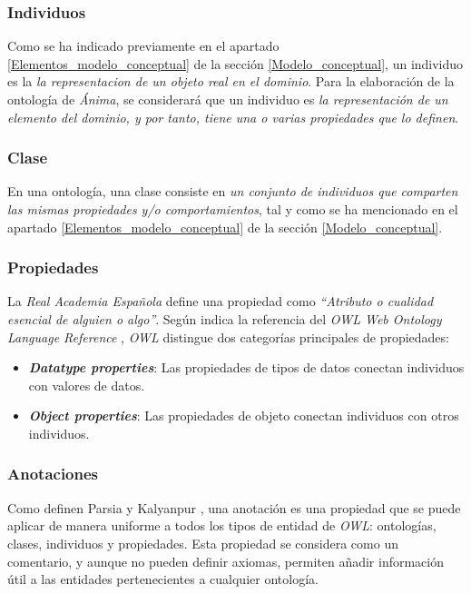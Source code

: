 \subsubsection{Individuos}
Como se ha indicado previamente en el apartado \ref*{Elementos_modelo_conceptual} de la sección \ref*{Modelo_conceptual}, 
un individuo es la \textit{la representacion de un objeto real en el dominio}. Para la elaboración de la ontología de 
\textit{Ánima}, se considerará que un individuo es \textit{la representación de un elemento del dominio, y por tanto, 
tiene una o varias propiedades que lo definen}.

\subsubsection{Clase}
En una ontología, una clase consiste en \textit{un conjunto de individuos que comparten las mismas propiedades y/o 
comportamientos}, tal y como se ha mencionado en el apartado \ref*{Elementos_modelo_conceptual} 
de la sección \ref*{Modelo_conceptual}.

\subsubsection{Propiedades}
La \textit{Real Academia Española} \autocite*{propiedadRAE} define una propiedad como 
\textit{“Atributo o cualidad esencial de alguien o algo”}. Según indica la referencia del 
\textit{OWL Web Ontology Language Reference} \autocite*{Bechhofer2004a}, \textit{OWL} distingue 
dos categorías principales de propiedades:

\begin{itemize}
    \item \textit{\textbf{Datatype properties}}: Las propiedades de tipos de datos conectan individuos con valores de datos.
    \item \textit{\textbf{Object properties}}: Las propiedades de objeto conectan individuos con otros individuos.
\end{itemize}

\subsubsection{Anotaciones}
Como definen Parsia y Kalyanpur \autocite*{Parsia2004}, una anotación es una propiedad que se puede aplicar de manera uniforme a todos los tipos de entidad 
de \textit{OWL}: ontologías, clases, individuos y propiedades. Esta propiedad se considera como un 
comentario, y aunque no pueden definir axiomas, permiten añadir información útil a las entidades pertenecientes 
a cualquier ontología. \medskip

